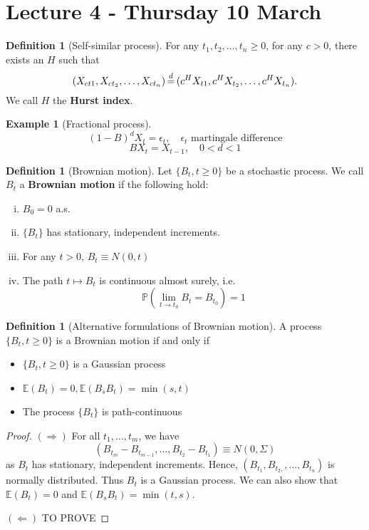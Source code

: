\documentclass[10pt, oneside, reqno]{amsart}
\theoremstyle{plain}%
\theoremstyle{definition}
\newtheorem{defn}[thm]{Definition}
\newtheorem{exmp}[thm]{Example}
\theoremstyle{remark}
\renewcommand{\P}{\mathbb{P}}
\newcommand{\E}{\mathbb{E}}
\def\eqd{\,{\buildrel d \over =}\,}
\begin{document}
\section{Lecture 4 - Thursday 10 March} %
\label{sec:lecture_4_thursday_10_march}

\begin{defn}[Self-similar process]
    For any $t_1, t_2, \dots, t_n \geq 0$, for any $c > 0$, there exists an $H$ such that \[
        (X_{ct1}, X_{ct_2}, \dots, X_{ct_n}) \eqd   (c^H X_{t1}, c^H X_{t_2}, \dots, c^H X_{t_n}).
    \]
    We call $H$ the \textbf{Hurst index}.
\end{defn}

\begin{exmp}[Fractional process]
    \[
        (1-B)^d X_t = \epsilon_t, \quad \epsilon_t \text{ martingale difference}
    \]
    \[
        B X_t = X_{t-1}, \quad 0 < d < 1
    \]
\end{exmp}

\begin{defn}[Brownian motion]
    Let $\{ B_t, t \geq 0 \}$ be a stochastic process.  We call $B_t$ a \textbf{Brownian motion} if the following hold:
    \begin{enumerate}[(i)]
        \item $B_0 = 0$ a.s.
        \item $\{B_t \}$ has stationary, independent increments.
        \item For any $t > 0$, $B_t \equiv N(0,t)$
        \item The path $t \mapsto B_t$ is continuous almost surely, i.e.\[
            \P(\lim_{t \rightarrow t_0} B_t = B_{t_0}) = 1
        \]
    \end{enumerate}
\end{defn}

\begin{defn}[Alternative formulations of Brownian motion]
    A process $\{ B_t, t \geq 0 \}$ is a Brownian motion if and only if 
    \begin{itemize}
        \item $\{ B_t, t \geq 0 \}$ is a Gaussian process
        \item $\E(B_t) = 0, \E(B_s B_t) = \min(s,t)$
        \item The process $\{ B_t \}$ is path-continuous
    \end{itemize}
\end{defn}

\begin{proof}
    $(\Rightarrow)$  For all $t_1, \dots, t_m$, we have \[
        (B_{t_m} - B_{t_{m-1}}, \dots, B_{t_2} - B_{t_1}) \equiv N(0, \Sigma)
    \]
    as $B_t$ has stationary, independent increments.  Hence, $(B_{t_1}, B_{t_2,}, \dots, B_{t_n})$ is normally distributed.  Thus $B_t$ is a Gaussian process.  We can also show that $\E(B_t) = 0$ and $\E(B_s B_t) = \min(t,s)$.  
    
    $(\Leftarrow)$ TO PROVE
\end{proof}
\end{document}
